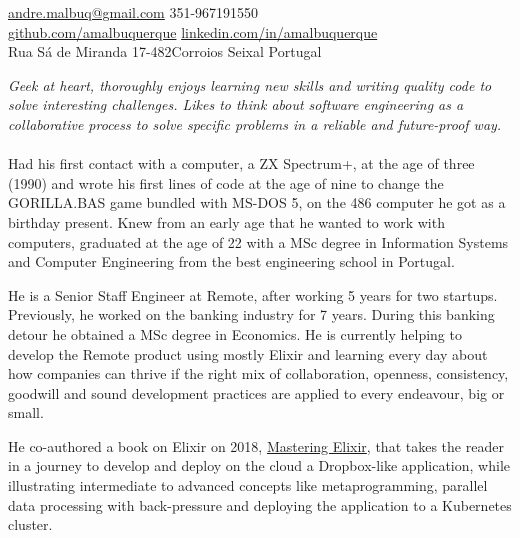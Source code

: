 \documentclass[10pt,a4paper]{article}
\begin{document}
\sloppy  %



\nobreakvspace{0.3em}  %

\noindent\href{mailto:andre.malbuq.at.gmail.com}{andre.malbuq\mbox{}@\mbox{}gmail.com}\sbull
\textsmaller{+}351-967191550
\\
\noindent\href{https://github.com/amalbuquerque}{github.com/amalbuquerque}\sbull
\href{http://linkedin.com/in/amalbuquerque}{linkedin.com/in/amalbuquerque}
\\
Rua Sá de Miranda 17-482\thinspace Corroios\sbull
Seixal\sbull
Portugal

\spacedhrule{0.9em}{-0.4em}  %


\vspace{-1.3em}  %
\begin{multicols}{2}  %
\noindent \emph{Geek at heart, thoroughly enjoys learning new skills and writing
  quality code to solve interesting challenges. Likes to think about software
  engineering as a collaborative process to solve specific problems in a
  reliable and future-proof way.}
\\
\\
Had his first contact with a computer, a ZX Spectrum+, at the age of three
(1990) and wrote his first lines of code at the age of nine to change the
GORILLA.BAS game bundled with MS-DOS 5, on the 486 computer he got as a
birthday present. Knew from an early age that he wanted to work with computers,
graduated at the age of 22 with a MSc degree in Information Systems and Computer
Engineering from the best engineering school in Portugal.

He is a Senior Staff Engineer at Remote, after working 5 years for two startups.
Previously, he worked on the banking industry for 7 years. During
this banking detour he obtained a MSc degree in Economics.
He is currently helping to develop the Remote product using mostly Elixir
and learning every day about how companies can thrive if the right mix
of collaboration, openness, consistency, goodwill and sound development practices
are applied to every endeavour, big or small.

He co-authored a book on Elixir on 2018,
\href{https://www.packtpub.com/application-development/mastering-elixir}{Mastering
Elixir}, that takes the reader in a journey to develop and deploy on the cloud
a Dropbox-like application, while illustrating intermediate to advanced concepts
like metaprogramming, parallel data processing with back-pressure and deploying
the application to a Kubernetes cluster.
\end{multicols}
\end{document}
